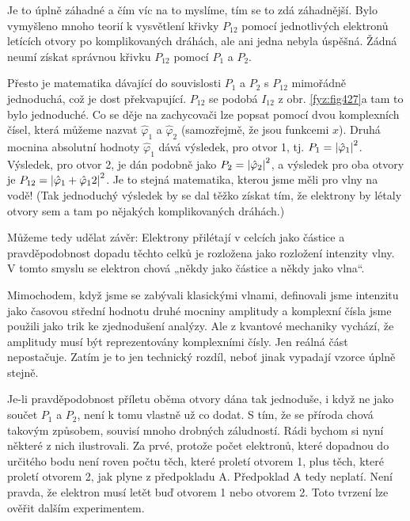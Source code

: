     Je to úplně záhadné a čím víc na to myslíme, tím se to zdá záhadnější. Bylo vymyšleno mnoho
    teorií k vysvětlení křivky \(P_{12}\)  pomocí jednotlivých elektronů letících otvory po
    komplikovaných dráhách, ale ani jedna nebyla úspěšná. Žádná neumí získat správnou křivku
    \(P_{12}\)  pomocí \(P_1\)  a \(P_2\).
    
    Přesto je matematika dávající do souvislosti \(P_1\)  a \(P_2\) s \(P_{12}\)  mimořádně
    jednoduchá, což je dost překvapující. \(P_{12}\)  se podobá \(I_{12}\) z obr. \ref{fyz:fig427}a
    tam to bylo jednoduché. Co se děje na zachycovači lze popsat pomocí dvou komplexních čísel,
    která můžeme nazvat \(\hat{\varphi}_1\) a \(\hat{\varphi}_2\) (samozřejmě, že jsou funkcemi
    \(x\)). Druhá mocnina absolutní hodnoty \(\hat{\varphi}_1\)  dává výsledek, pro otvor 1, tj.
    \(P_1=\left\lvert\hat{\varphi}_1\right\rvert^2\). Výsledek, pro otvor 2, je dán podobně jako
    \(P_2=\left\lvert\hat{\varphi}_2\right\rvert^2\), a výsledek pro oba otvory je \(P_{12}=\left\lvert\hat{\varphi}_1 +
    \hat{\varphi}_12\right\rvert^2\). Je to stejná matematika, kterou jsme měli pro vlny na vodě! (Tak
    jednoduchý výsledek by se dal těžko získat tím, že elektrony by létaly otvory sem a tam po
    nějakých komplikovaných dráhách.)
    
    Můžeme tedy udělat závěr: Elektrony přilétají v celcích jako částice a pravděpodobnost dopadu
    těchto celků je rozložena jako rozložení intenzity vlny. V tomto smyslu se elektron chová „někdy
    jako částice a někdy jako vlna“.
    
    Mimochodem, když jsme se zabývali klasickými vlnami, definovali jsme intenzitu jako časovou
    střední hodnotu druhé mocniny amplitudy a komplexní čísla jsme použili jako trik ke zjednodušení
    analýzy. Ale z kvantové mechaniky vychází, že amplitudy musí být reprezentovány komplexními
    čísly. Jen reálná část nepostačuje. Zatím je to jen technický rozdíl, neboť jinak vypadají
    vzorce úplně stejně.
    
    Je-li pravděpodobnost příletu oběma otvory dána tak jednoduše, i když ne jako součet \(P_1\)  a
    \(P_2\), není k tomu vlastně už co dodat. S tím, že se příroda chová takovým způsobem, souvisí
    mnoho drobných záludností. Rádi bychom si nyní některé z nich ilustrovali. Za prvé, protože
    počet elektronů, které dopadnou do určitého bodu není roven počtu těch, které proletí otvorem 1,
    plus těch, které proletí otvorem 2, jak plyne z předpokladu A. Předpoklad A tedy neplatí. Není
    pravda, že elektron musí letět buď otvorem 1 nebo otvorem 2. Toto tvrzení lze ověřit dalším
    experimentem.
      
